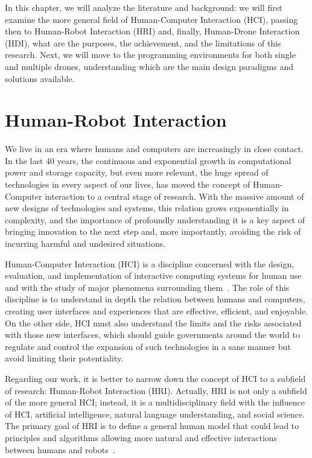 In this chapter, we will analyze the literature and background: we will first examine the more general field of Human-Computer Interaction (HCI), passing then to Human-Robot Interaction (HRI) and, finally, Human-Drone Interaction (HDI), what are the purposes, the achievement, and the limitations of this research. 
Next, we will move to the programming environments for both single and multiple drones, understanding 
which are the main design paradigms and solutions available. 


\section{Human-Robot Interaction}\label{sec:soa_hri}
We live in an era where humans and computers are increasingly in close contact. In the last 40 years, the continuous and exponential growth 
in computational power and storage capacity, but even more relevant, the huge spread of technologies in every aspect of our lives,
has moved the concept of Human-Computer interaction to a central stage of research. 
With the massive amount of new designs of technologies and systems, this relation grows exponentially in complexity, 
and the importance of profoundly understanding it is a key aspect of bringing innovation to the next step and, more importantly, 
avoiding the risk of incurring harmful and undesired situations.

Human-Computer Interaction (HCI) is a discipline concerned with the design, evaluation, and implementation of interactive computing systems for human use
and with the study of major phenomena surrounding them~\cite{sinha2010human}.
The role of this discipline is to understand in depth the relation between humans and computers, creating user interfaces and experiences that are effective, efficient, and enjoyable. 
On the other side, HCI must also understand the limits and the risks associated with those new interfaces, which should guide governments around the world to regulate 
and control the expansion of such technologies in a sane manner but avoid limiting their potentiality.

Regarding our work, it is better to narrow down the concept of HCI to a subfield of research: Human-Robot Interaction (HRI). 
Actually, HRI is not only a subfield of the more general HCI; instead, it is a multidisciplinary field with the influence of HCI, 
artificial intelligence, natural language understanding, and social science.
The primary goal of HRI is to define a general human model that could lead to principles and algorithms allowing more natural and 
effective interactions between humans and robots~\cite{hri2009davidMaya}.

